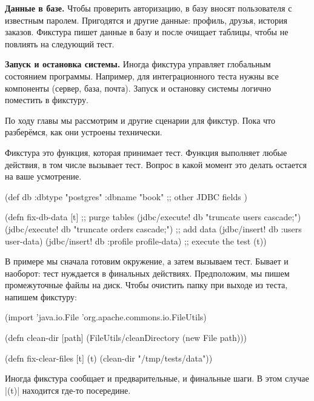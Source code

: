 \textbf{Данные в базе.} Чтобы проверить авторизацию, в базу вносят пользователя
с известным паролем. Пригодятся и другие данные: профиль, друзья, история
заказов. Фикстура пишет данные в базу и после очищает таблицы, чтобы не повлиять
на следующий тест.

\textbf{Запуск и остановка системы.} Иногда фикстура управляет глобальным
состоянием программы. Например, для интеграционного теста нужны все компоненты
(сервер, база, почта). Запуск и остановку системы логично поместить в фикстуру.

По ходу главы мы рассмотрим и другие сценарии для фикстур. Пока что разберёмся,
как они устроены технически.

Фикстура это функция, которая принимает тест. Функция выполняет любые действия,
в том числе вызывает тест. Вопрос в какой момент это делать остается на ваше
усмотрение.


\begin{english}
  \begin{clojure}
(def db {:dbtype "postgres" :dbname "book"
         ;; other JDBC fields
         })

(defn fix-db-data [t]
  ;; purge tables
  (jdbc/execute! db "truncate users cascade;")
  (jdbc/execute! db "truncate orders cascade;")
  ;; add data
  (jdbc/insert! db :users user-data)
  (jdbc/insert! db :profile profile-data)
  ;; execute the test
  (t))
  \end{clojure}
\end{english}

В примере мы сначала готовим окружение, а затем вызываем тест. Бывает и
наоборот: тест нуждается в финальных действиях. Предположим, мы пишем
промежуточные файлы на диск. Чтобы очистить папку при выходе из теста, напишем
фикстуру:


\begin{english}
  \begin{clojure}
(import 'java.io.File
        'org.apache.commons.io.FileUtils)

(defn clean-dir [path]
  (FileUtils/cleanDirectory (new File path)))

(defn fix-clear-files [t]
  (t)
  (clean-dir "/tmp/tests/data"))
  \end{clojure}
\end{english}

Иногда фикстура сообщает и предварительные, и финальные шаги. В этом случае
\spverb|(t)| находится где-то посередине.

